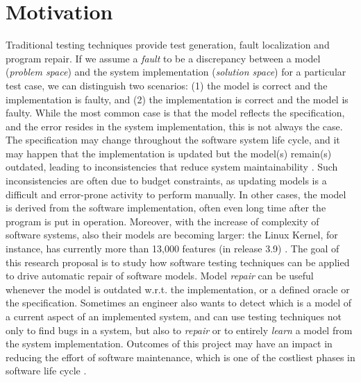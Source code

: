 \documentclass[
11pt, %
oneside, %
english, %
singlespacing, %
headsepline, %
]{MastersDoctoralThesis} %
\theoremstyle{plain}
\theoremstyle{definition}
\theoremstyle{remark}
\theoremstyle{remark}
\theoremstyle{plain}
\theoremstyle{plain}
\begin{document}
\section{Motivation}
Traditional testing techniques provide test generation, fault localization and program repair. %
If we assume a \textit{fault} to be a discrepancy between a model (\textit{problem space}) and the system implementation (\textit{solution space}) for a particular test case, we can distinguish two scenarios: (1) the model is correct and the implementation is faulty, and (2) the implementation is correct and the model is faulty.
While the most common case is that the model reflects the specification, and the error resides in the system implementation, this is not always the case.
The specification may change throughout the software system life cycle, and it may happen that the implementation is updated but the model(s) remain(s) outdated, leading to inconsistencies that reduce system maintainability \cite{rost2013software}. %
Such inconsistencies are often due to budget constraints, as updating models is a difficult and error-prone activity to perform manually. %
In other cases, the model is derived from the software implementation, often even long time after the program is put in operation. 
Moreover, with the increase of complexity of software systems, also their models are becoming larger: the Linux Kernel, for instance, has currently more than 13,000 features (in release 3.9) \cite{passos2018study}. %
The goal of this research proposal is to study how software testing techniques can be applied to drive automatic repair of software models.
Model \textit{repair} can be useful whenever the model is outdated w.r.t. the implementation, or a defined oracle or the specification.
Sometimes an engineer also wants to detect which is a model of a current aspect of an implemented system, and can use testing techniques not only to find bugs in a system, but also to \textit{repair} or to entirely \textit{learn} a model from the system implementation. 
Outcomes of this project may have an impact in reducing the effort of software maintenance, which is one of the costliest phases in software life cycle \cite{zarnekow2005distribution}.
\end{document}
